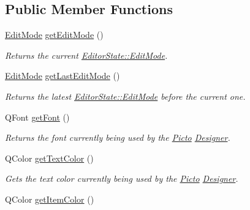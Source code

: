 \subsection*{Public Member Functions}
\begin{DoxyCompactItemize}
\item 
\hyperlink{class_editor_state_a30123e595784b2228edc2a0c2b46ab28}{Edit\-Mode} \hyperlink{class_editor_state_adc415e8403fef1a8888c995201a54d5b}{get\-Edit\-Mode} ()
\begin{DoxyCompactList}\small\item\em Returns the current \hyperlink{class_editor_state_a30123e595784b2228edc2a0c2b46ab28}{Editor\-State\-::\-Edit\-Mode}. \end{DoxyCompactList}\item 
\hyperlink{class_editor_state_a30123e595784b2228edc2a0c2b46ab28}{Edit\-Mode} \hyperlink{class_editor_state_a8090b6bbc15324fbebffcb8bb9779e47}{get\-Last\-Edit\-Mode} ()
\begin{DoxyCompactList}\small\item\em Returns the latest \hyperlink{class_editor_state_a30123e595784b2228edc2a0c2b46ab28}{Editor\-State\-::\-Edit\-Mode} before the current one. \end{DoxyCompactList}\item 
Q\-Font \hyperlink{class_editor_state_a585c1b6550fdcf92a8f9286c7ae28df4}{get\-Font} ()
\begin{DoxyCompactList}\small\item\em Returns the font currently being used by the \hyperlink{namespace_picto}{Picto} \hyperlink{class_designer}{Designer}. \end{DoxyCompactList}\item 
Q\-Color \hyperlink{class_editor_state_adce02af07f16a48c21fe37c8db82feaf}{get\-Text\-Color} ()
\begin{DoxyCompactList}\small\item\em Gets the text color currently being used by the \hyperlink{namespace_picto}{Picto} \hyperlink{class_designer}{Designer}. \end{DoxyCompactList}\item 
\hypertarget{class_editor_state_a89992ece78c605b6fed0d3a0a175f41d}{Q\-Color \hyperlink{class_editor_state_a89992ece78c605b6fed0d3a0a175f41d}{get\-Item\-Color} ()}\label{class_editor_state_a89992ece78c605b6fed0d3a0a175f41d}


\end{DoxyCompactItemize}
